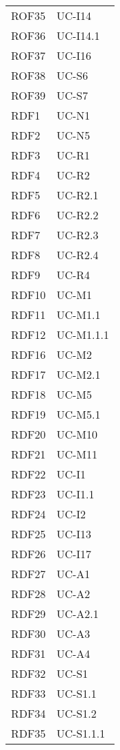 \begin{longtable}{| p{5cm} | p{5cm} |}
		\rowcolor{LightGray}
		ROF35 & UC-I14\\
		ROF36 & UC-I14.1\\
		\rowcolor{LightGray}
		ROF37 & UC-I16\\
		ROF38 & UC-S6\\
		\rowcolor{LightGray}
		ROF39 & UC-S7\\		
		RDF1 & UC-N1\\
		\rowcolor{LightGray}
		RDF2 & UC-N5\\
		RDF3 & UC-R1 \\
		\rowcolor{LightGray}
		RDF4 & UC-R2\\
		RDF5 & UC-R2.1\\
		\rowcolor{LightGray}
		RDF6 & UC-R2.2\\
		RDF7 & UC-R2.3\\
		\rowcolor{LightGray}
		RDF8 & UC-R2.4\\
		RDF9 & UC-R4\\
		\rowcolor{LightGray}
		RDF10 & UC-M1\\
		RDF11 & UC-M1.1 \\
		\rowcolor{LightGray}
		RDF12 & UC-M1.1.1 \\
		\rowcolor{LightGray}
		RDF16 & UC-M2 \\
		RDF17 & UC-M2.1 \\
		\rowcolor{LightGray}
		RDF18 & UC-M5 \\
		RDF19 & UC-M5.1 \\
		\rowcolor{LightGray}	
		RDF20 & UC-M10\\
		RDF21 & UC-M11\\
		\rowcolor{LightGray}
		RDF22 & UC-I1\\
		RDF23 & UC-I1.1\\
		\rowcolor{LightGray}
		RDF24 & UC-I2 \\
		RDF25 & UC-I13 \\
		\rowcolor{LightGray}
		RDF26 & UC-I17\\
		RDF27 & UC-A1\\
		\rowcolor{LightGray}
		RDF28 & UC-A2\\
		RDF29 & UC-A2.1\\
		\rowcolor{LightGray}
		RDF30 & UC-A3\\
		RDF31 & UC-A4\\
		\rowcolor{LightGray}
		RDF32 & UC-S1\\
		RDF33 & UC-S1.1\\
		\rowcolor{LightGray}
		RDF34 & UC-S1.2\\
		RDF35 & UC-S1.1.1\\

\end{longtable}
